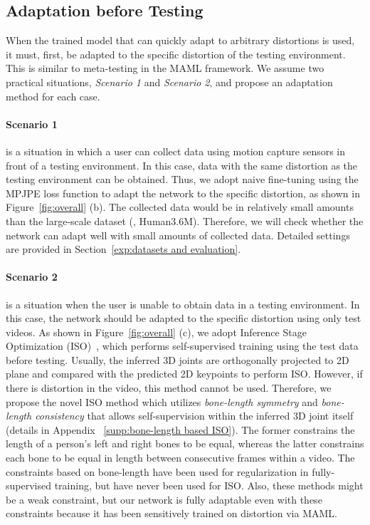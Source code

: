     \subsection{Adaptation before Testing}
        When the trained model that can quickly adapt to arbitrary distortions is used, it must, first, be adapted to the specific distortion of the testing environment. This is similar to meta-testing in the MAML framework. We assume two practical situations, \textit{Scenario 1} and \textit{Scenario 2}, and propose an adaptation method for each case.
        \vspace{-4mm}
        
        \paragraph{Scenario 1} is a situation in which a user can collect data using motion capture sensors in front of a testing environment. In this case, data with the same distortion as the testing environment can be obtained. Thus, we adopt naive fine-tuning using the MPJPE loss function to adapt the network to the specific distortion, as shown in Figure~\ref{fig:overall} (b). The collected data would be in relatively small amounts than the large-scale dataset (\eg, Human3.6M). Therefore, we will check whether the network can adapt well with small amounts of collected data. Detailed settings are provided in Section~\ref{exp:datasets and evaluation}.
        \vspace{-4mm}
        
        \paragraph{Scenario 2} is a situation when the user is unable to obtain data in a testing environment. In this case, the network should be adapted to the specific distortion using only test videos. As shown in Figure~\ref{fig:overall} (c), we adopt Inference Stage Optimization (ISO)~\cite{ref18_ISO_NeurIPS2020}, which performs self-supervised training using the test data before testing. Usually, the inferred 3D joints are orthogonally projected to 2D plane and compared with the predicted 2D keypoints to perform ISO. However, if there is distortion in the video, this method cannot be used. Therefore, we propose the novel ISO method which utilizes \textit{bone-length symmetry} and \textit{bone-length consistency} that allows self-supervision within the inferred 3D joint itself (details in Appendix ~\ref{supp:bone-length based ISO}). The former constrains the length of a person's left and right bones to be equal, whereas the latter constrains each bone to be equal in length between consecutive frames within a video. The constraints based on bone-length have been used for regularization in fully-supervised training, but have never been used for ISO. Also, these methods might be a weak constraint, but our network is fully adaptable even with these constraints because it has been sensitively trained on distortion via MAML.
    
